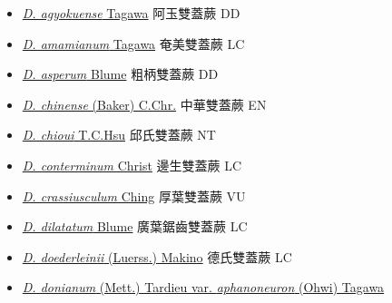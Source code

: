 \begin{itemize}
  \begin{itemize}
        \item[] \href{http://www.theplantlist.org/tpl1.1/search?q=Diplazium+agyokuense}{\textit{D. agyokuense} Tagawa}   阿玉雙蓋蕨   DD
        \item[] \href{http://www.theplantlist.org/tpl1.1/search?q=Diplazium+amamianum}{\textit{D. amamianum} Tagawa}   奄美雙蓋蕨   LC
        \item[] \href{http://www.theplantlist.org/tpl1.1/search?q=Diplazium+asperum}{\textit{D. asperum} Blume}   粗柄雙蓋蕨   DD
        \item[] \href{http://www.theplantlist.org/tpl1.1/search?q=Diplazium+chinense}{\textit{D. chinense} (Baker) C.Chr.}   中華雙蓋蕨   EN
        \item[] \href{http://www.theplantlist.org/tpl1.1/search?q=Diplazium+chioui}{\textit{D. chioui} T.C.Hsu}   邱氏雙蓋蕨   NT
        \item[] \href{http://www.theplantlist.org/tpl1.1/search?q=Diplazium+conterminum}{\textit{D. conterminum} Christ}   邊生雙蓋蕨   LC
        \item[] \href{http://www.theplantlist.org/tpl1.1/search?q=Diplazium+crassiusculum}{\textit{D. crassiusculum} Ching}   厚葉雙蓋蕨   VU
        \item[] \href{http://www.theplantlist.org/tpl1.1/search?q=Diplazium+dilatatum}{\textit{D. dilatatum} Blume}   廣葉鋸齒雙蓋蕨   LC
        \item[] \href{http://www.theplantlist.org/tpl1.1/search?q=Diplazium+doederleinii}{\textit{D. doederleinii} (Luerss.) Makino}   德氏雙蓋蕨   LC
        \item[] \href{http://www.theplantlist.org/tpl1.1/search?q=Diplazium+donianum+var.+aphanoneuron}{\textit{D. donianum} (Mett.) Tardieu var. \textit{aphanoneuron} (Ohwi) Tagawa}  

\end{itemize}
\end{itemize}
